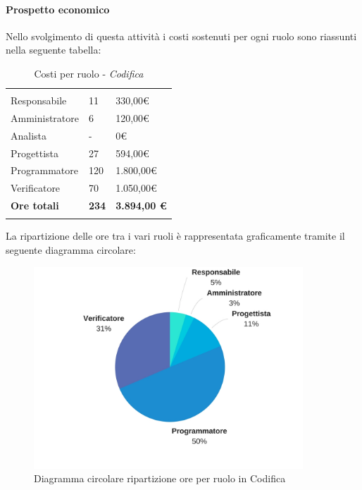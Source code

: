 			\paragraph{Prospetto economico} \Spazio
			Nello svolgimento di questa attività i costi sostenuti per ogni ruolo sono riassunti nella seguente tabella:
			\begin{table}[H]
				\centering
				\begin{tabular}{|p{4cm}|C{4cm}|C{4cm}|}
					
					 & &\\
					Responsabile & 11 & 330,00\euro \\
					\hline
					Amministratore& 6 & 120,00\euro \\
					\hline
					Analista & - & 0\euro \\
					\hline
					Progettista & 27 & 594,00\euro \\
					\hline
					Programmatore & 120 & 1.800,00\euro \\
					\hline
					Verificatore & 70 & 1.050,00\euro \\
					\hline
					\textbf{Ore totali} & \textbf{234} & \textbf{3.894,00 \euro} \\
				\end{tabular}
					\caption{Costi per ruolo - \textit{Codifica}}
			\end{table}
			
			La ripartizione delle ore tra i vari ruoli è rappresentata graficamente tramite il seguente diagramma circolare:

		\begin{figure}[H] 
			\centering 
			\includegraphics[width=0.9\textwidth]{images/CircolareCodifica.jpg} 
			\caption{Diagramma circolare ripartizione ore per ruolo in Codifica}
			\label{CircolareCodifica}
		\end{figure}
	
